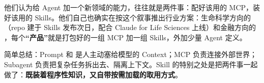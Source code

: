 他们认为给 Agent 加一个新领域的能力，往往就是两件事：配好该用的 MCP，装好该用的 Skills。他们自己也确实在按这个叙事推出行业方案：生命科学方向的 （repo 建于 Skills 发布次日，配合 Claude for Life Sciences 上线）和金融方向的 ，每个\textbf{“产品”}就是打包好的一组 MCP 加一组 Skills，外加少量 Agent 定义。

简单总结：Prompt 和  是人主动塞给模型的 Context；MCP 负责连接外部世界；Subagent 负责把复杂任务拆出去、隔离上下文。Skill 的特别之处是把两件事一起做了：\textbf{既装着程序性知识，又自带按需加载的取用方式}。
